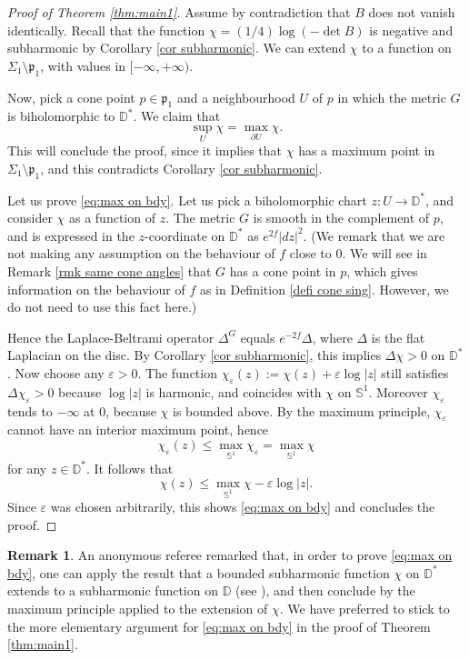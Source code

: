 \documentclass[11pt]{article}
\let\epsilon\varepsilon
\theoremstyle{definition}
\newtheorem{remark}[cor]{Remark}
\begin{document}
\begin{proof}[Proof of Theorem \ref{thm:main1}]
Assume by contradiction that $B$ does not vanish identically. Recall that the function $\chi=(1/4)\log(-\det B)$ is negative and subharmonic by Corollary \ref{cor subharmonic}. We can extend $\chi$ to a function on $\Sigma_1\setminus \mathfrak p_1$, with values in $[-\infty,+\infty)$.

Now, pick a cone point $p\in\mathfrak p_1$ and a neighbourhood $U$ of $p$ in which the metric $G$ is biholomorphic to $\mathbb D^*$. We claim that
\begin{equation}\label{eq:max on bdy}
\sup_U \chi=\max_{\partial U}\chi.
\end{equation}
This will conclude the proof, since it implies that $\chi$ has a maximum point in $\Sigma_1\setminus \mathfrak p_1$, and this contradicts Corollary \ref{cor subharmonic}.

Let us prove \eqref{eq:max on bdy}. Let us pick a biholomorphic chart $z:U\to\mathbb D^*$, and consider $\chi$ as a function of $z$. The metric $G$ is {smooth in the complement of $p$, and is expressed in the $z$-coordinate on $\mathbb D^*$ as $e^{2f}|dz|^2$.} {(We remark that we are not making any assumption on the behaviour of $f$ close to $0$. We will see in Remark \ref{rmk same cone angles} that $G$ has a cone point in $p$, which gives information on the behaviour of $f$ as in Definition \ref{defi cone sing}. However, we do not need to use this fact here.)}

Hence the Laplace-Beltrami operator $\Delta^G$ equals $e^{-2f}\Delta$, where $\Delta$ is the flat Laplacian on the disc. By Corollary \ref{cor subharmonic}, this implies $\Delta\chi>0$ on $\mathbb D^*$. Now choose any $\epsilon>0$. The function $\chi_\epsilon(z):=\chi(z)+\epsilon\log|z|$ still satisfies $\Delta\chi_\epsilon>0$ because $\log|z|$ is harmonic, and coincides with $\chi$ on $\mathbb S^1$. Moreover $\chi_\epsilon$ tends to $-\infty$ at $0$, because $\chi$ is bounded above. By the maximum principle, $\chi_\epsilon$ cannot have an interior maximum point, hence
\[
\chi_\epsilon(z)\leq \max_{\mathbb S^1}\chi_\epsilon=\max_{\mathbb S^1}\chi
\]
for any $z\in \mathbb D^*$. It follows that
\[
\chi(z)\leq \max_{\mathbb S^1}\chi-\epsilon\log|z|.
\]
Since $\epsilon$ was chosen arbitrarily, this shows \eqref{eq:max on bdy} and concludes the proof.
\end{proof}

\begin{remark}\label{referee}
An anonymous referee remarked that, in order to prove \eqref{eq:max on bdy}, one can apply the result that a bounded subharmonic function $\chi$ on $\mathbb D^*$ extends to a subharmonic function on $\mathbb D$ (see \cite[Th.\,5.18]{zbMATH03652704}), and then conclude by the maximum principle applied to the extension of $\chi$.
We have preferred to stick to the more elementary argument for \eqref{eq:max on bdy} in the proof of Theorem \ref{thm:main1}.
\end{remark}
\end{document}
